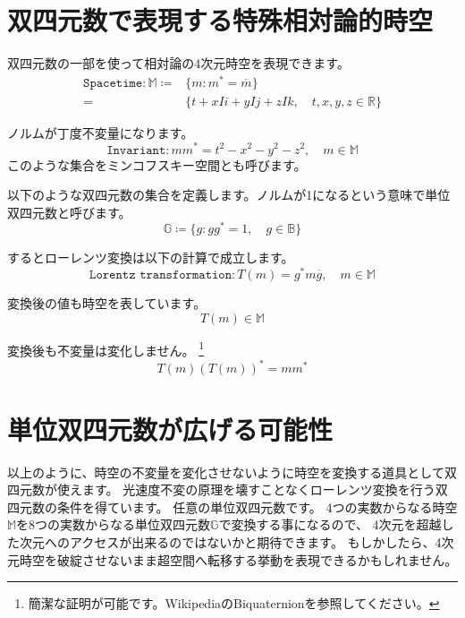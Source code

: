 \documentclass[a4paper,12pt,notitlepage]{jsreport}
\begin{document}
\section{双四元数で表現する特殊相対論的時空}

双四元数の一部を使って相対論の4次元時空を表現できます。
\begin{equation}
\begin{split}
\texttt{Spacetime}:\mathbb{M}\coloneq &\{m:m^*=\overline{m}\}\\
=&\{t+xIi+yIj+zIk,\quad t,x,y,z\in\mathbb{R}\}
\end{split}
\end{equation}

ノルムが丁度不変量になります。
\begin{equation}
\texttt{Invariant}:mm^*=t^2-x^2-y^2-z^2,\quad m\in\mathbb{M}
\end{equation}
このような集合をミンコフスキー空間とも呼びます。

以下のような双四元数の集合を定義します。ノルムが1になるという意味で単位双四元数と呼びます。
\begin{equation}
\mathbb{G}\coloneq\{g:gg^*=1,\quad g\in\mathbb{B}\}
\end{equation}

するとローレンツ変換は以下の計算で成立します。
\begin{equation}
\texttt{Lorentz transformation}:T(m)=g^*m\overline{g},\quad m\in\mathbb{M}
\end{equation}

変換後の値も時空を表しています。
\begin{equation}
T(m)\in\mathbb{M}
\end{equation}

変換後も不変量は変化しません。
\footnote{簡潔な証明が可能です。WikipediaのBiquaternionを参照してください。}
\begin{equation}
T(m)(T(m))^*=mm^*
\end{equation}

\section{単位双四元数が広げる可能性}

以上のように、時空の不変量を変化させないように時空を変換する道具として双四元数が使えます。
光速度不変の原理を壊すことなくローレンツ変換を行う双四元数の条件を得ています。
任意の単位双四元数です。
4つの実数からなる時空$\mathbb{M}$を8つの実数からなる単位双四元数$\mathbb{G}$で変換する事になるので、
4次元を超越した次元へのアクセスが出来るのではないかと期待できます。
もしかしたら、4次元時空を破綻させないまま超空間へ転移する挙動を表現できるかもしれません。
\end{document}

